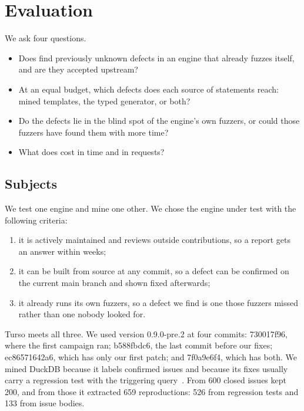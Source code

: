 \section{Evaluation}
\label{sec:eval}

We ask four questions.
\begin{itemize}
  \item[\rqref{1}] Does \tool find previously unknown defects in an engine that
        already fuzzes itself, and are they accepted upstream?
  \item[\rqref{2}] At an equal budget, which defects does each source of
        statements reach: mined templates, the typed generator, or both?
  \item[\rqref{3}] Do the defects lie in the blind spot of the engine's own
        fuzzers, or could those fuzzers have found them with more time?
  \item[\rqref{4}] What does \tool cost in time and in requests?
\end{itemize}

\subsection{Subjects}
\label{sec:subjects}
We test one engine and mine one other. We chose the engine under test with the
following criteria:
\begin{enumerate}
  \item it is actively maintained and reviews outside contributions, so a report
        gets an answer within weeks;
  \item it can be built from source at any commit, so a defect can be confirmed
        on the current main branch and shown fixed afterwards;
  \item it already runs its own fuzzers, so a defect we find is one those fuzzers
        missed rather than one nobody looked for.
\end{enumerate}
Turso meets all three. We used version 0.9.0-pre.2 at four commits: 730017f96,
where the first campaign ran; b588fbdc6, the last commit before our fixes;
ec86571642a6, which has only our first patch; and 7f0a9e6f4, which has both.
We mined DuckDB because it labels confirmed issues and because its fixes usually
carry a regression test with the triggering query~\cite{duckdb27846}. From 600
closed issues \tool kept 200, and from those it extracted 659 reproductions: 526
from regression tests and 133 from issue bodies.

